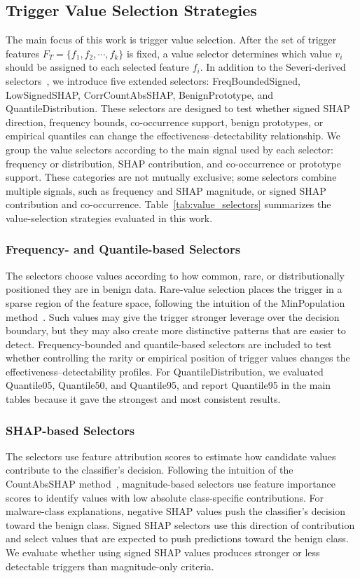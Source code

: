 \subsection{Trigger Value Selection Strategies}
The main focus of this work is trigger value selection.
After the set of trigger features $F_{T} = \{f_{1}, f_{2}, \cdots, f_{k}\}$ is fixed, a value selector determines which value $v_{i}$ should be assigned to each selected feature $f_{i}$.
In addition to the Severi-derived selectors~\cite{severi}, we introduce five extended selectors: FreqBoundedSigned, LowSignedSHAP, CorrCountAbsSHAP, BenignPrototype, and QuantileDistribution.
These selectors are designed to test whether signed SHAP direction, frequency bounds, co-occurrence support, benign prototypes, or empirical quantiles can change the effectiveness--detectability relationship.
We group the value selectors according to the main signal used by each selector: frequency or distribution, SHAP contribution, and co-occurrence or prototype support.
These categories are not mutually exclusive; some selectors combine multiple signals, such as frequency and SHAP magnitude, or signed SHAP contribution and co-occurrence.
Table~\ref{tab:value_selectors} summarizes the value-selection strategies evaluated in this work.

\subsubsection{Frequency- and Quantile-based Selectors}
The selectors choose values according to how common, rare, or distributionally positioned they are in benign data.
Rare-value selection places the trigger in a sparse region of the feature space, following the intuition of the MinPopulation method~\cite{severi}.
Such values may give the trigger stronger leverage over the decision boundary, but they may also create more distinctive patterns that are easier to detect.
Frequency-bounded and quantile-based selectors are included to test whether controlling the rarity or empirical position of trigger values changes the effectiveness--detectability profiles.
For QuantileDistribution, we evaluated Quantile05, Quantile50, and Quantile95, and report Quantile95 in the main tables because it gave the strongest and most consistent results.

\subsubsection{SHAP-based Selectors}
The selectors use feature attribution scores to estimate how candidate values contribute to the classifier's decision.
Following the intuition of the CountAbsSHAP method~\cite{severi}, magnitude-based selectors use feature importance scores to identify values with low absolute class-specific contributions.
For malware-class explanations, negative SHAP values push the classifier's decision toward the benign class.
Signed SHAP selectors use this direction of contribution and select values that are expected to push predictions toward the benign class.
We evaluate whether using signed SHAP values produces stronger or less detectable triggers than magnitude-only criteria.

